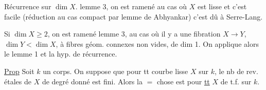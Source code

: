 Récurrence sur $\dim X$.
lemme 3, on est ramené au cas où $X$ est lisse et
c'est facile (réduction au cas compact par lemme de Abhyankar)
c'est dû à Serre-Lang.

Si $\dim X\geq2$, on est ramené 
lemme 3, au cas où il y a une fibration  $X\to Y$, $\dim Y<\dim X$, 
 à fibres géom. connexes non vides, de dim 1.
On applique alors le lemme 1 et la hyp. de récurrence.

\uline{Prop} Soit $k$ un corps. On suppose que pour tt 
courbe  lisse $X$ sur $k$, le nb de rev. étales de $X$ de degré donné est fini.
Alors la $=$ chose est  pour \uline{tt} $X$ de t.f. sur $k$.
